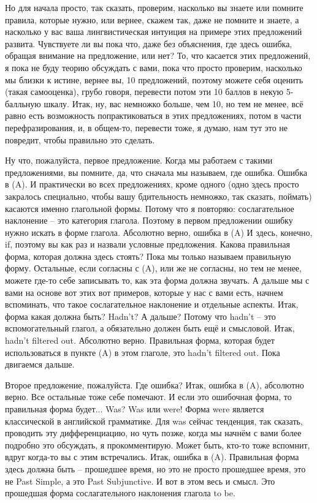 \documentclass[main.tex]{subfiles}
\begin{document}
Но для начала просто, так сказать, проверим, насколько вы знаете или помните правила, которые нужно, или вернее, скажем так, даже не помните и знаете, а насколько у вас ваша лингвистическая интуиция на примере этих предложений развита.
Чувствуете ли вы пока что, даже без объяснения, где здесь ошибка, обращая внимание на предложение, или нет?
То, что касается этих предложений, я пока не буду теорию обсуждать с вами, пока что просто проверим, насколько мы близки к истине, вернее вы, 10 предложений, поэтому можете себя оценить (такая самооценка), грубо говоря, перевести потом эти 10 баллов в некую 5-балльную шкалу.
Итак, ну, вас немножко больше, чем 10, но тем не менее, всё равно есть возможность попрактиковаться в этих предложениях, потом в части перефразирования, и, в общем-то, перевести тоже, я думаю, нам тут это не повредит, чтобы правильно это сделать.

Ну что, пожалуйста, первое предложение.
Когда мы работаем с такими предложениями, вы помните, да, что сначала мы называем, где ошибка.
Ошибка в (A).
И практически во всех предложениях, кроме одного (одно здесь просто закралось специально, чтобы вашу бдительность немножко, так сказать, поймать) касаются именно глагольной формы.
Потому что я повторяю: сослагательное наклонение -- это категория глагола.
Поэтому в первом предложении ошибку нужно искать в форме глагола.
Абсолютно верно, ошибка в (A)
И здесь, конечно, if, поэтому вы как раз и назвали условные предложения.
Какова правильная форма, которая должна здесь стоять? 
Пока мы только называем правильную форму.
Остальные, если согласны с (A), или же не согласны, но тем не менее, можете где-то себе записывать то, как эта форма должна звучать.
А дальше мы с вами на основе вот этих вот примеров, которые у нас с вами есть, начнем вспоминать, что такое сослагательное наклонение и отдельные аспекты.
Итак, форма какая должна быть?
Hadn't?
А дальше?
Потому что hadn't -- это вспомогательный глагол, а обязательно должен быть ещё и смысловой.
Итак, hadn't filtered out.
Абсолютно верно.
Правильная форма, которая будет использоваться в пункте (A) в этом глаголе, это hadn't filtered out.
Пока двигаемся дальше.

Второе предложение, пожалуйста.
Где ошибка? 
Итак, ошибка в (A), абсолютно верно.
Все остальные тоже себе помечают.
И если это ошибочная форма, то правильная форма будет...
Was?
Was или were!
Форма were является классической в английской грамматике.
Для was сейчас тенденция, так сказать, проводить эту дифференциацию, но чуть позже, когда мы начнём с вами более подробно это обсуждать, я прокомментирую.
Может быть, кто-то тоже вспомнит, вдруг когда-то вы с этим встречались.
Итак, ошибка в (A).
Правильная форма здесь должна быть -- прошедшее время, но это не просто прошедшее время, это не Past Simple, а это Past Subjunctive.
И вот в этом весь и смысл.
Это прошедшая форма сослагательного наклонения глагола to be.
\end{document}
